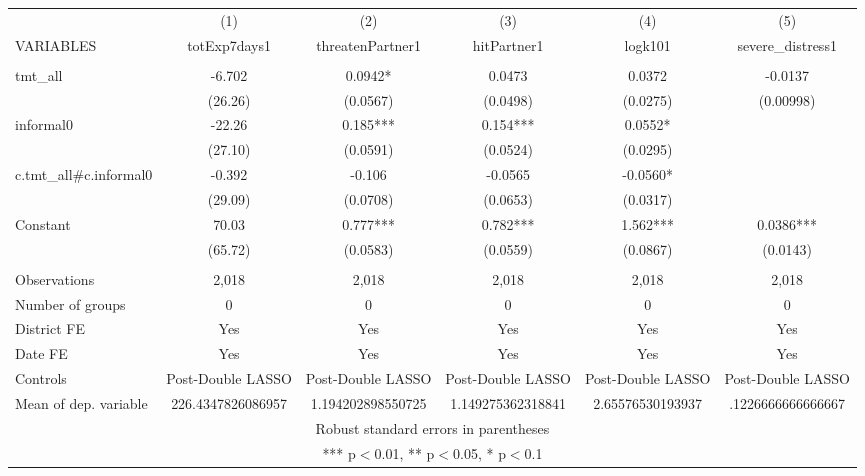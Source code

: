 \documentclass[]{article}
\begin{document}
\begin{tabular}{lccccc} \hline
 & (1) & (2) & (3) & (4) & (5) \\
VARIABLES & totExp7days1 & threatenPartner1 & hitPartner1 & logk101 & severe\_distress1 \\ \hline
 &  &  &  &  &  \\
tmt\_all & -6.702 & 0.0942* & 0.0473 & 0.0372 & -0.0137 \\
 & (26.26) & (0.0567) & (0.0498) & (0.0275) & (0.00998) \\
informal0 & -22.26 & 0.185*** & 0.154*** & 0.0552* &  \\
 & (27.10) & (0.0591) & (0.0524) & (0.0295) &  \\
c.tmt\_all\#c.informal0 & -0.392 & -0.106 & -0.0565 & -0.0560* &  \\
 & (29.09) & (0.0708) & (0.0653) & (0.0317) &  \\
Constant & 70.03 & 0.777*** & 0.782*** & 1.562*** & 0.0386*** \\
 & (65.72) & (0.0583) & (0.0559) & (0.0867) & (0.0143) \\
 &  &  &  &  &  \\
Observations & 2,018 & 2,018 & 2,018 & 2,018 & 2,018 \\
Number of groups & 0 & 0 & 0 & 0 & 0 \\
District FE & Yes & Yes & Yes & Yes & Yes \\
Date FE & Yes & Yes & Yes & Yes & Yes \\
Controls & Post-Double LASSO & Post-Double LASSO & Post-Double LASSO & Post-Double LASSO & Post-Double LASSO \\
 Mean of dep. variable & 226.4347826086957 & 1.194202898550725 & 1.149275362318841 & 2.65576530193937 & .1226666666666667 \\ \hline
\multicolumn{6}{c}{ Robust standard errors in parentheses} \\
\multicolumn{6}{c}{ *** p$<$0.01, ** p$<$0.05, * p$<$0.1} \\
\end{tabular}
\end{document}
